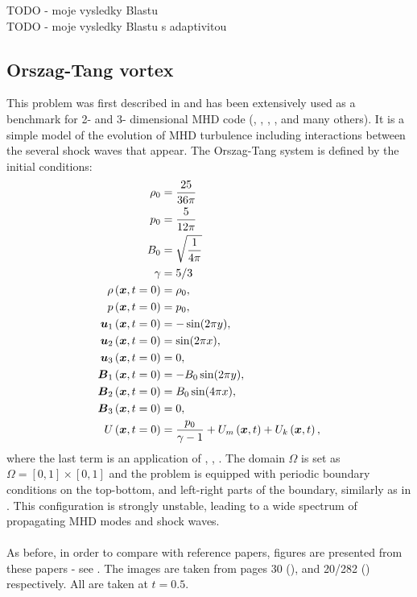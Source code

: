 TODO - moje vysledky Blastu\\
TODO - moje vysledky Blastu s adaptivitou\\

\subsection{Orszag-Tang vortex}
This problem was first described in \cite{vortex} and has been extensively used as a benchmark for 2- and 3- dimensional MHD code (\cite{blast0}, \cite{blast1}, \cite{honzaFem}, \cite{otnew}, and many others). It is a simple model of the evolution of MHD turbulence including interactions between the several shock waves that appear. The Orszag-Tang system is defined by the initial conditions:
\begin{align}
\rho_0 & =  \frac{25}{36 \pi}\\ \nonumber
p_0 & =  \frac{5}{12 \pi}\\  \nonumber
B_0 & =  \sqrt{\frac{1}{4 \pi}}\\ \nonumber
\gamma & =  5 / 3\\ \nonumber
\rho\left(\mbox{\boldmath $x$}, t = 0\right) & =  \rho_0,\\ \nonumber
p\left(\mbox{\boldmath $x$}, t = 0\right) & =  p_0,\\ \nonumber
\mbox{\boldmath $u$}_1\left(\mbox{\boldmath $x$}, t = 0\right) & =  -\sin(2 \pi y),\\ \nonumber
\mbox{\boldmath $u$}_2\left(\mbox{\boldmath $x$}, t = 0\right) & =  \sin(2 \pi x),\\ \nonumber
\mbox{\boldmath $u$}_3\left(\mbox{\boldmath $x$}, t = 0\right) & =  0,\\ \nonumber
\mbox{\boldmath $B$}_1\left(\mbox{\boldmath $x$}, t = 0\right) & =  -B_0 \sin(2 \pi y),\\ \nonumber
\mbox{\boldmath $B$}_2\left(\mbox{\boldmath $x$}, t = 0\right) & =  B_0 \sin(4 \pi x),\\ \nonumber
\mbox{\boldmath $B$}_3\left(\mbox{\boldmath $x$}, t = 0\right) & =  0,\\ \nonumber
U\left(\mbox{\boldmath $x$}, t = 0\right) & =  \frac{p_0}{\gamma - 1} + U_m\left(\mbox{\boldmath $x$}, t\right) + U_k\left(\mbox{\boldmath $x$}, t\right),
\end{align}
where the last term is an application of , , . The domain $\Omega$ is set as $\Omega = [0, 1] \times [0, 1]$ and the problem is equipped with periodic boundary conditions on the top-bottom, and left-right parts of the boundary, similarly as in . This configuration is strongly unstable, leading to a wide spectrum of propagating MHD modes and shock waves.
\paragraph{}
As before, in order to compare with reference papers, figures are presented from these papers - see . The images are taken from pages 30 (\cite{blast1}), and 20/282 (\cite{blast0}) respectively. All are taken at $t = 0.5$.


